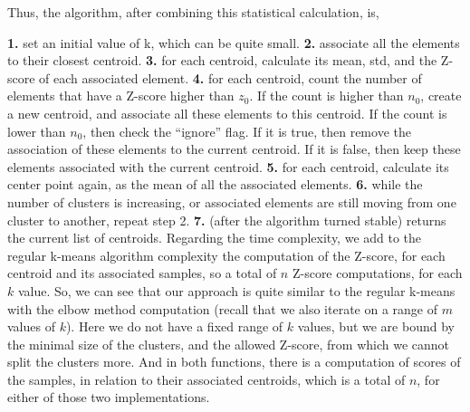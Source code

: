 \documentclass[12pt]{article}
\begin{document}
Thus, the algorithm, after combining this statistical calculation, is,

\textbf{1.} set an initial value of k, which can be quite small. \newline
\textbf{2.} associate all the elements to their closest centroid. \newline
\textbf{3.} for each centroid, calculate its mean, std, and the Z-score of each associated element. \newline
\textbf{4.} for each centroid, count the number of elements that have a Z-score higher than $z_0$. If the count is higher than $n_0$, create a new centroid, and associate all these elements to this centroid.
If the count is lower than $n_0$, then check the “ignore” flag. If it is true, then remove the association of these elements to the current centroid. If it is false, then keep these elements associated with the current centroid. \newline
\textbf{5.} for each centroid, calculate its center point again, as the mean of all the associated elements. \newline
\textbf{6.} while the number of clusters is increasing, or associated elements are still moving from one cluster to another, repeat step 2. \newline
\textbf{7.} (after the algorithm turned stable) returns the current list of centroids. \newline
Regarding the time complexity, we add to the regular k-means algorithm complexity the computation of the Z-score, for each centroid and its associated samples, so a total of $n$ Z-score computations, for each $k$ value. So, we can see that our approach is quite similar to the regular k-means with the elbow method computation (recall that we also iterate on a range of $m$ values of $k$). Here we do not have a fixed range of $k$ values, but we are bound by the minimal size of the clusters, and the allowed Z-score, from which we cannot split the clusters more. And in both functions, there is a computation of scores of the samples, in relation to their associated centroids, which is a total of $n$, for either of those two implementations.
\newpage
\end{document}
